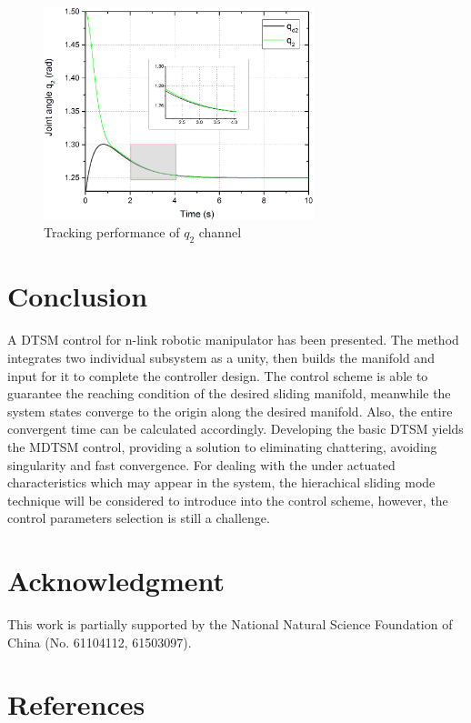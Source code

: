 \documentclass[3p]{elsarticle}
\theoremstyle{plain}
\theoremstyle{remark}
\begin{document}
\begin{figure}
\centering
\includegraphics[width=0.7\textwidth]{paper3_fig7.eps}
\caption{Tracking performance of $q_2$ channel}
\label{Figure:7}
\end{figure}
\section{Conclusion}\label{sec:5}
A DTSM control for n-link robotic manipulator has been presented. The method integrates two individual subsystem as a unity, then builds the manifold and input for it to complete the controller design. The control scheme is able to guarantee the reaching condition of the desired sliding manifold, meanwhile the system states converge to the origin along the desired manifold. Also, the entire convergent time can be calculated accordingly. Developing the basic DTSM yields the MDTSM control, providing a solution to eliminating chattering, avoiding singularity and fast convergence. For dealing with the under actuated characteristics which may appear in the system, the hierachical sliding mode technique will be considered to introduce into the control scheme, however, the control parameters selection is still a challenge.
\section{Acknowledgment}
This work is partially supported by the National Natural Science Foundation of China (No. 61104112, 61503097).
\section{References}


\end{document}
